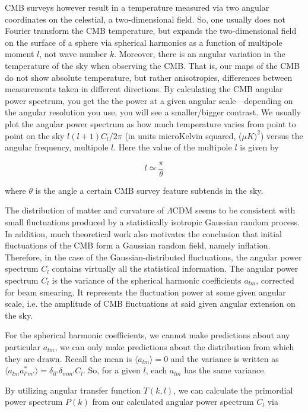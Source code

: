 \documentclass[12pt]{article}
\begin{document}
CMB surveys however result in a temperature measured via two angular coordinates on the celestial, a two-dimensional field. So, one usually does not Fourier transform the CMB temperature, but expands the two-dimensional field on the surface of a sphere via spherical harmonics as a function of multipole moment $l$, not wave number $k$. Moreover, there is an angular variation in the temperature of the sky when observing the CMB. That is, our maps of the CMB do not show absolute temperature, but rather anisotropies, differences between measurements taken in different directions. By calculating the CMB angular power spectrum, you get the the power at a given angular scale---depending on the angular resolution you use, you will see a smaller/bigger contrast. We usually plot the angular power spectrum as how much temperature varies from point to point on the sky $l(l+1)C_l/2\pi$ (in units microKelvin squared, ($\mu K)^2$) versus the angular frequency, multipole $l$. Here the value of the multipole $l$ is given by 

\begin{equation}
l\simeq\frac{\pi}{\theta}
\end{equation}

where $\theta$ is the angle a certain CMB survey feature subtends in the sky. 


The distribution of matter and curvature of $\Lambda$CDM seems to be consistent with small fluctuations  produced by a statistically isotropic Gaussian random process. In addition, much theoretical work also motivates the conclusion that initial fluctuations of the CMB form a Gaussian random field, namely inflation.
Therefore, in the case of the Gaussian-distributed fluctuations, the angular power spectrum $C_l$ contains virtually all the statistical information. The angular power spectrum $C_l$ is the variance of the spherical harmonic coefficients $a_{lm}$, corrected for beam smearing. It represents the fluctuation power at some given angular scale, i.e. the amplitude of CMB fluctuations at said given angular extension on the sky. 

For the spherical harmonic coefficients, we cannot make predictions about any particular $a_{lm}$, we can only make predictions about the distribution from which they are drawn. Recall the mean is $\langle a_{lm}\rangle=0$ and the variance is written as $\langle a_{lm} a^{*}_{l'm'}\rangle=\delta_{ll'}\delta_{mm'}C_l$. So, for a given $l$, each $a_{lm}$ has the same variance.

By utilizing angular transfer function $T(k,l)$, we can calculate the primordial power spectrum $P(k)$ from our calculated angular power spectrum $C_l$ via
\end{document}
